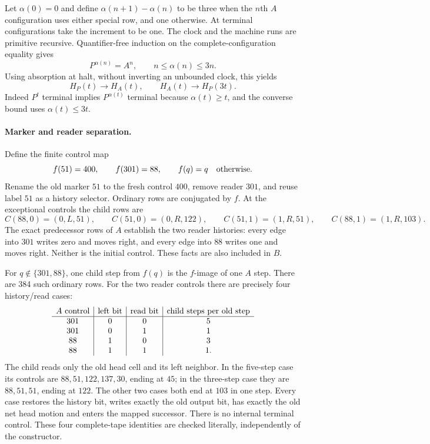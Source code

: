 Let $\alpha(0)=0$ and define $\alpha(n+1)-\alpha(n)$ to be three
when the $n$th $A$ configuration uses either special row, and one otherwise.
At terminal configurations take the increment to be one.
The clock and the machine runs are primitive recursive.  Quantifier-free
induction on the complete-configuration equality gives
\[
 P^{\alpha(n)}=A^n,
 \qquad n\le\alpha(n)\le3n.
\]
Using absorption at halt, without inverting an unbounded clock, this yields
\[
 H_P(t)\to H_A(t),\qquad H_A(t)\to H_P(3t).
 \tag{A}
\]
Indeed $P^t$ terminal implies $P^{\alpha(t)}$ terminal because
$\alpha(t)\ge t$, and the converse bound uses $\alpha(t)\le3t$.

\paragraph{Marker and reader separation.}
Define the finite control map
\[
 f(51)=400,\qquad f(301)=88,\qquad f(q)=q\quad\hbox{otherwise}.
\]
Rename the old marker $51$ to the fresh control $400$, remove reader
$301$, and reuse label $51$ as a history selector.  Ordinary rows are
conjugated by $f$.  At the exceptional controls the child rows are
\[
 C(88,0)=(0,L,51),\qquad
 C(51,0)=(0,R,122),\qquad
 C(51,1)=(1,R,51),\qquad
 C(88,1)=(1,R,103).
\]
The exact predecessor rows of $A$ establish the two reader histories:
every edge into $301$ writes zero and moves right, and every edge into
$88$ writes one and moves right.  Neither is the initial control.  These
facts are also included in $B$.

For $q\notin\{301,88\}$, one child step from $f(q)$ is the $f$-image
of one $A$ step.  There are 384 such ordinary rows.  For the two reader
controls there are precisely four history/read cases:
\[
\begin{array}{c|c|c|c}
 A\hbox{ control}&\hbox{left bit}&\hbox{read bit}&
 \hbox{child steps per old step}\\\hline
301&0&0&5\\
301&0&1&1\\
88&1&0&3\\
88&1&1&1.
\end{array}
\]
The child reads only the old head cell and its left neighbor.  In the
five-step case its controls are $88,51,122,137,30$, ending at $45$;
in the three-step case they are $88,51,51$, ending at $122$.
The other two cases both end at $103$ in one step.  Every case restores
the history bit, writes exactly the old output bit, has exactly the old
net head motion and enters the mapped successor.  There is no internal
terminal control.  These four complete-tape identities are checked
literally, independently of the constructor.

